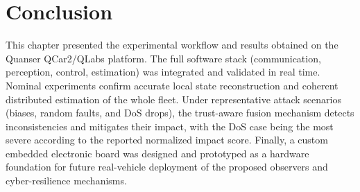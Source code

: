 \section{Conclusion}\label{chp6_sec_conclusion}
This chapter presented the experimental workflow and results obtained on the Quanser QCar2/QLabs platform.
The full software stack (communication, perception, control, estimation) was integrated and validated in real time.
Nominal experiments confirm accurate local state reconstruction and coherent distributed estimation of the whole fleet.
Under representative attack scenarios (biases, random faults, and DoS drops), the trust-aware fusion mechanism detects inconsistencies and mitigates their impact, with the DoS case being the most severe according to the reported normalized impact score.
Finally, a custom embedded electronic board was designed and prototyped as a hardware foundation for future real-vehicle deployment of the proposed observers and cyber-resilience mechanisms.
